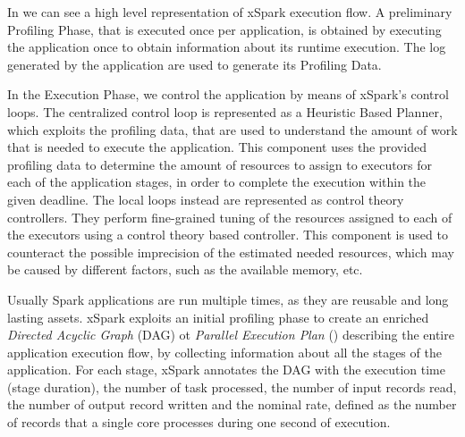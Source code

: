 In  we can see a high level representation of xSpark execution flow. A preliminary Profiling Phase, that is executed once per application, is obtained by executing the application once to obtain information about its runtime execution. The log generated by the application are used to generate its Profiling Data.

In the Execution Phase, we control the application by means of xSpark’s control loops. 
The centralized control loop is represented as a Heuristic Based Planner, which exploits the profiling data, that are used to understand the amount of work that is needed to execute the application. This component uses the provided profiling data to determine the amount of resources to assign to executors for each of the application stages, in order to complete the execution within the given deadline. The local loops instead are represented as control theory controllers. They perform fine-grained tuning of the resources assigned to each of the executors using a control theory based controller. This component is used to counteract the possible imprecision of the estimated needed resources, which may be caused by different factors, such as the available memory, etc.

Usually Spark applications are run multiple times, as they are reusable and long lasting assets. xSpark exploits an initial profiling phase to create an enriched \textit{Directed Acyclic Graph} (DAG) ot \textit{Parallel Execution Plan} (\plan) describing the entire application execution flow, by collecting information about all the stages of the application. For each stage, xSpark annotates the DAG with the execution time (stage duration), the number of task processed, the number of input records read, the number of output record written and the nominal rate, defined as the number of records that a single core processes during one second of execution. 

%

